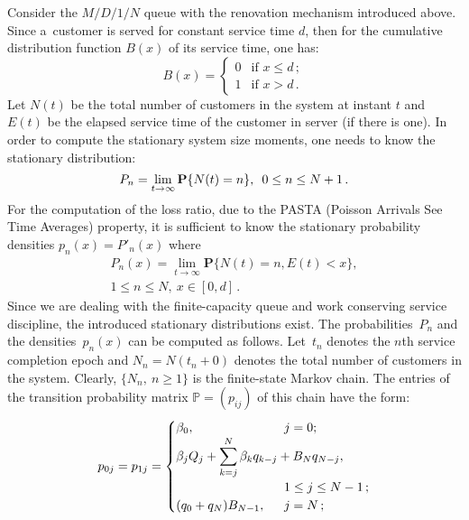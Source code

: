 \begin{multicols}{2}
\noindent
Consider the $M/D/1/N$ queue with the renovation mechanism
introduced above. Since a~customer is served for constant service time
$d$, then for the cumulative distribution function $B(x)$ 
of its service time, one has: 
$$
B(x)=
\begin{cases}
0 & \mbox{if } x \le d\,;\\
1 & \mbox{if } x>d\,.
\end{cases}
$$
Let $N(t)$ be the total number of customers %
in the system at instant $t$ 
and $E(t)$ be the elapsed service time of the customer in server
(if there is one). 
In order to compute the stationary system size moments, 
one needs to know the stationary distribution:
\begin{equation*}
P_n=\lim\limits_{t \rightarrow \infty} \mathbf{P}\{ N(t)=n \},\enskip  0 \le n \le N+1\,.
\end{equation*} 
For the computation of the loss ratio,
due to the \mbox{PASTA} (Poisson Arrivals See Time Averages) 
property, it is sufficient to know
 the stationary probability densities
$p_n(x)=P'_n(x)$ where
\begin{multline*}
P_n(x)=\lim\limits_{t \rightarrow \infty} \mathbf{P}\{ N(t)=n, E(t)<x \}, \\ 
1\le n \le N, \ x \in [0,d]\,.
\end{multline*}
Since we are dealing with the finite-capacity queue 
and work conserving service discipline, the
introduced stationary distributions exist.  
The probabilities~$P_n$ and 
the densities~$p_n(x)$ can be computed as follows. 
Let~$t_n$ denotes the $n$th service completion epoch 
and $N_n=N(t_n+0)$ denotes the total number of customers in the system. 
Clearly, $\{ N_n, \ n \ge 1\}$ is the finite-state Markov chain.
The entries of the transition probability matrix $\mathbb{P}=(p_{ij})$
of this chain have the form:
$$
p_{0j}=p_{1j}=
\begin{cases}
\beta_0, & \hspace*{-20mm}j=0;\\
\beta_j Q_j + \displaystyle\sum\limits_{k=j}^N \beta_k q_{k-j} +  B_N q_{N-j}, &\\
&\hspace*{-20mm} 1 \le j \le N-1\,;\\
(q_0 + q_N) B_{N-1}, & \hspace*{-20mm}j=N\,;
\end{cases}
$$
\begin{multline*}

\end{multline*}
\end{multicols}

